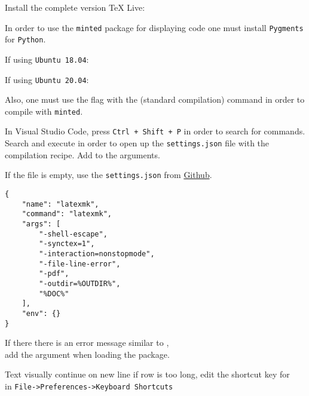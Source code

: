 Install the complete version TeX Live:


In order to use the \texttt{minted} package for displaying code one must install \texttt{Pygments} for \texttt{Python}.

If using \texttt{Ubuntu 18.04}:


If using \texttt{Ubuntu 20.04}:


Also, one must use the  flag with the  (standard compilation) command in order to compile with \texttt{minted}.

In Visual Studio Code, press \texttt{Ctrl + Shift + P} in order to search for commands. Search and execute  in order to open up the \texttt{settings.json} file with the compilation recipe. Add  to the arguments.

If the file is empty, use the \texttt{settings.json} from \href{https://github.com/robinhellmers/computer_setup/blob/master/latex-workshop/settings.json}{Github}.

\begin{verbatim}
{
    "name": "latexmk",
    "command": "latexmk",
    "args": [
        "-shell-escape",
        "-synctex=1",
        "-interaction=nonstopmode",
        "-file-line-error",
        "-pdf",
        "-outdir=%OUTDIR%",
        "%DOC%"
    ],
    "env": {}
}
\end{verbatim}

If there there is an error message similar to ,\\
add the argument  when loading the  package. 



Text visually continue on new line if row is too long, edit the shortcut key for\\ in \texttt{File->Preferences->Keyboard Shortcuts}


